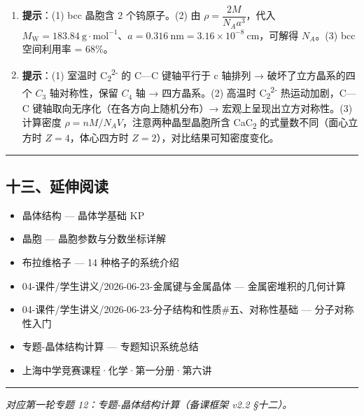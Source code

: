 \documentclass[a4paper,11pt]{ctexart}
\providecommand{\tightlist}{\setlength{\itemsep}{0pt}\setlength{\parskip}{0pt}}
\begin{document}
\begin{enumerate}
\def\labelenumi{\arabic{enumi}.}
\setcounter{enumi}{6}
\item
  \textbf{提示}：(1) bcc 晶胞含 2 个钨原子。(2) 由 \(\rho = \dfrac{2M}{N_A a^3}\)，代入 \(M_{\mathrm{W}} = 183.84\ \mathrm{g\cdot mol^{-1}}\)、\(a = 0.316\ \mathrm{nm} = 3.16\times 10^{-8}\ \mathrm{cm}\)，可解得 \(N_A\)。(3) bcc 空间利用率 = 68\%。
\item
  \textbf{提示}：(1) 室温时 C\textsubscript{2}\textsuperscript{2-} 的 C---C 键轴平行于 c 轴排列 → 破坏了立方晶系的四个 \(C_3\) 轴对称性，保留 \(C_4\) 轴 → 四方晶系。(2) 高温时 C\textsubscript{2}\textsuperscript{2-} 热运动加剧，C---C 键轴取向无序化（在各方向上随机分布）→ 宏观上呈现出立方对称性。(3) 计算密度 \(\rho = nM/N_A V\)，注意两种晶型晶胞所含 CaC\textsubscript{2} 的式量数不同（面心立方时 \(Z = 4\)，体心四方时 \(Z = 2\)），对比结果可知密度变化。
\end{enumerate}

\begin{center}\rule{0.5\linewidth}{0.5pt}\end{center}

\subsection{十三、延伸阅读}\label{ux5341ux4e09ux5ef6ux4f38ux9605ux8bfb}

\begin{itemize}
\tightlist
\item
  晶体结构 --- 晶体学基础 KP
\item
  晶胞 --- 晶胞参数与分数坐标详解
\item
  布拉维格子 --- 14 种格子的系统介绍
\item
  04-课件/学生讲义/2026-06-23-金属键与金属晶体 --- 金属密堆积的几何计算
\item
  04-课件/学生讲义/2026-06-23-分子结构和性质\#五、对称性基础 --- 分子对称性入门
\item
  专题-晶体结构计算 --- 专题知识系统总结
\item
  上海中学竞赛课程·化学·第一分册·第六讲
\end{itemize}

\begin{center}\rule{0.5\linewidth}{0.5pt}\end{center}

\emph{对应第一轮专题 12：专题-晶体结构计算（备课框架 v2.2 §十二）。}
\end{document}
